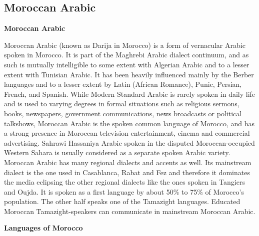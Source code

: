 \documentclass[11pt]{scrartcl} %
\begin{document}
\subsection{Moroccan Arabic}

\textbf{Moroccan Arabic}\par

Moroccan Arabic (known as Darija in Morocco) is a form of vernacular Arabic spoken in Morocco. It is part of the Maghrebi Arabic dialect continuum, and as such is mutually intelligible to some extent with Algerian Arabic and to a lesser extent with Tunisian Arabic. It has been heavily influenced mainly by the Berber languages and to a lesser extent by Latin (African Romance), Punic, Persian, French, and Spanish. While Modern Standard Arabic is rarely spoken in daily life and is used to varying degrees in formal situations such as religious sermons, books, newspapers, government communications, news broadcasts or political talkshows, Moroccan Arabic is the spoken common language of Morocco, and has a strong presence in Moroccan television entertainment, cinema and commercial advertising. Sahrawi Hassaniya Arabic spoken in the disputed Moroccan-occupied Western Sahara is usually considered as a separate spoken Arabic variety. Moroccan Arabic has many regional dialects and accents as well. Its mainstream dialect is the one used in Casablanca, Rabat and Fez and therefore it dominates the media eclipsing the other regional dialects like the ones spoken in Tangiers and Oujda. It is spoken as a first language by about 50\% to 75\% of Morocco's population. The other half speaks one of the Tamazight languages. Educated Moroccan Tamazight-speakers can communicate in mainstream Moroccan Arabic. \par

\noindent \textbf{Languages of Morocco} \par
\end{document}
